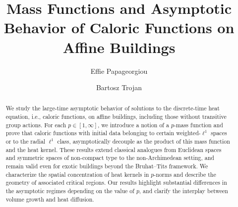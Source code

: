 \documentclass[11pt]{amsart}
\title[Mass Functions and Caloric Functions]
{Mass Functions and Asymptotic Behavior of Caloric Functions on Affine Buildings}
\author{Effie Papageorgiou}
\author{Bartosz Trojan}
\theoremstyle{plain}
\theoremstyle{definition}
\numberwithin{equation}{section}
\begin{document}

\begin{abstract}
	We study the large-time asymptotic behavior of solutions to the discrete-time heat equation, i.e., caloric functions, 
	on affine buildings, including those without transitive group actions. For each $p \in [1, \infty]$, we introduce a notion 
	of a $p$-mass function and prove that caloric functions with initial data belonging to certain weighted-$\ell^1$ spaces or
	to the radial $\ell^1$ class, asymptotically decouple as the product of this mass function and the heat kernel. 
	These results extend classical analogues from Euclidean spaces and symmetric spaces of non-compact type to the
	non-Archimedean setting, and remain valid even for exotic buildings beyond the Bruhat--Tits framework.
	We characterize the spatial concentration of heat kernels in $p$-norms and describe the geometry of associated critical
	regions. Our results highlight substantial differences in the asymptotic regimes depending on the value of $p$, and clarify 
	the interplay between volume growth and heat diffusion. 
\end{abstract}

\maketitle
\end{document}
